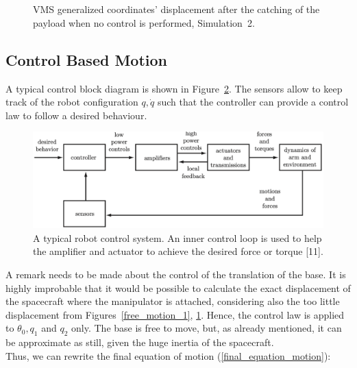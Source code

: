 \documentclass[a4paper,12pt,oneside]{report}
\begin{document}
\begin{figure}[!htb]
  \centering
  \subfloat
  {}\quad
\subfloat
  {} \\
  \subfloat
  {}\quad
  \subfloat
  {}\\
  \subfloat
  {}
  \caption{VMS generalized coordinates' displacement after the catching of the payload when no control is performed, Simulation~2.}
  \label{free_motion_2}
\end{figure}
\newpage
\FloatBarrier
\subsection{Control Based Motion}\label{control_motion}
A typical control block diagram is shown in Figure~\ref{block_diagram}. The sensors allow to keep track of the robot configuration $q,\dot{q}$ such that the controller can provide a control law to follow a desired behaviour.\\
\begin{figure}[b]
  \centering
  \includegraphics[scale=0.4]{control_diagram.png}
  \caption{A typical robot control system. An inner control loop is used to help the amplifier and actuator to achieve the desired force or torque [11].}
  \label{block_diagram}
\end{figure}
A remark needs to be made about the control of the translation of the base. It is highly improbable that it would be possible to calculate the exact displacement of the spacecraft where the manipulator is attached, considering also the too little displacement from Figures~\ref{free_motion_1}, \ref{free_motion_2}. Hence, the control law is applied to $\theta_0, q_1$ and $q_2$ only. The base is free to move, but, as already mentioned, it can be approximate as still, given the huge inertia of the spacecraft.\\ 
Thus, we can rewrite the final equation of motion (\ref{final_equation_motion}):
\end{document}
